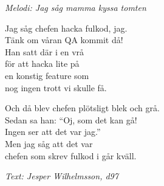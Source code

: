 {\footnotesize\textit{Melodi: Jag såg mamma kyssa tomten}}\par
\vspace{10pt}
Jag såg chefen hacka fulkod, jag.\\
Tänk om våran QA kommit då!\\
Han satt där i en vrå\\
för att hacka lite på\\
en konstig feature som\\
nog ingen trott vi skulle få.\par
\vspace{10pt}
Och då blev chefen plötsligt blek och grå.\\
Sedan sa han: ``Oj, som det kan gå!\\
Ingen ser att det var jag.''\\
Men jag såg att det var\\
chefen som skrev fulkod i går kväll.\par
\vspace{10pt}
{\footnotesize\textit{Text: Jesper Wilhelmsson, d97}}
